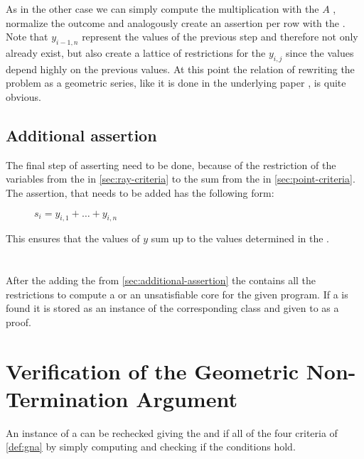 As in the other case we can simply compute the multiplication with the \updatematrix $A$ , normalize the outcome and analogously create an assertion per row with the \smtfactory. \newline
Note that $y_{i-1,n}$ represent the values of the previous step and therefore not only already exist, but also create a lattice of restrictions for the $y_{i,j}$ since the values depend highly on the previous values. At this point the relation of rewriting the problem as a geometric series, like it is done in the underlying paper \cite{leike2014geometric}, is quite obvious.

\subsection{Additional assertion}
\label{sec:additional-assertion}
The final step of asserting need to be done, because of the restriction of the variables from the \rayc in \autoref{sec:ray-criteria} to the sum from the \pointc in \autoref{sec:point-criteria}.\newline
The assertion, that needs to be added has the following form:
\begin{figure}[H]
	\centering
	$s_i = y_{i,1}+ \dots + y_{i,n}$
\end{figure}
This ensures that the values of $y$ sum up to the values determined in the \pointc.
\\
\\
\\
After the adding the \addass from \autoref{sec:additional-assertion} the \solver contains all the restrictions to compute a \gna or an unsatisfiable core for the given program.\newline
If a \gna is found it is stored as an instance of the corresponding class and given to \aprove as a proof.

\section{Verification of the Geometric Non-Termination Argument}
\label{sec:verification-of-gna}
An instance of a \gna can be rechecked giving the \iterationmatrix and \iterationconstants if all of the four criteria of \autoref{def:gna} by simply computing and checking if the conditions hold.
	 
